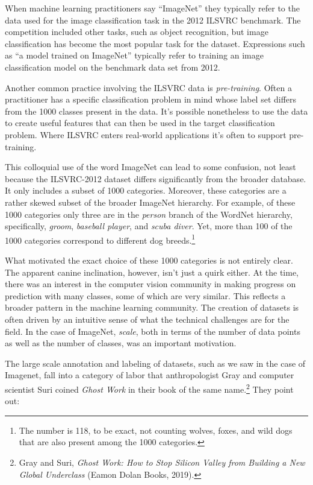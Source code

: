 \documentclass{tufte-book}
\begin{document}
When machine learning practitioners say ``ImageNet'' they typically
refer to the data used for the image classification task in the 2012
ILSVRC benchmark. The competition included other tasks, such as object
recognition, but image classification has become the most popular task
for the dataset. Expressions such as ``a model trained on ImageNet''
typically refer to training an image classification model on the
benchmark data set from 2012.

Another common practice involving the ILSVRC data is
\emph{pre-training}. Often a practitioner has a specific classification
problem in mind whose label set differs from the 1000 classes present in
the data. It's possible nonetheless to use the data to create useful
features that can then be used in the target classification problem.
Where ILSVRC enters real-world applications it's often to support
pre-training.

This colloquial use of the word ImageNet can lead to some confusion, not
least because the ILSVRC-2012 dataset differs significantly from the
broader database. It only includes a subset of 1000 categories.
Moreover, these categories are a rather skewed subset of the broader
ImageNet hierarchy. For example, of these 1000 categories only three are
in the \emph{person} branch of the WordNet hierarchy, specifically,
\emph{groom}, \emph{baseball player}, and \emph{scuba diver}. Yet, more
than 100 of the 1000 categories correspond to different dog
breeds.\footnote{The number is 118, to be exact, not counting wolves,
  foxes, and wild dogs that are also present among the 1000 categories.}

What motivated the exact choice of these 1000 categories is not entirely
clear. The apparent canine inclination, however, isn't just a quirk
either. At the time, there was an interest in the computer vision
community in making progress on prediction with many classes, some of
which are very similar. This reflects a broader pattern in the machine
learning community. The creation of datasets is often driven by an
intuitive sense of what the technical challenges are for the field. In
the case of ImageNet, \emph{scale}, both in terms of the number of data
points as well as the number of classes, was an important motivation.

The large scale annotation and labeling of datasets, such as we saw in
the case of Imagenet, fall into a category of labor that anthropologist
Gray and computer scientist Suri coined \emph{Ghost Work} in their book
of the same name.\footnote{Gray and Suri, \emph{Ghost Work: How to Stop
  Silicon Valley from Building a New Global Underclass} (Eamon Dolan
  Books, 2019).} They point out:
\end{document}
